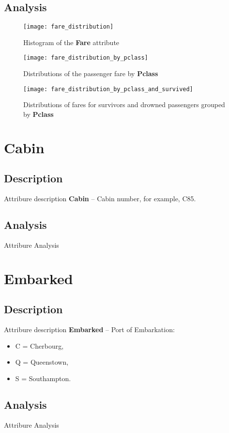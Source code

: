 \subsection{Analysis}

\begin{figure}[!ht]
    \centering
    \texttt{[image: fare\_distribution]}
    \caption{Histogram of the \textbf{Fare} attribute}
    \label{pic:fare_distribution}
\end{figure}

\begin{figure}[!ht]
    \centering
    \texttt{[image: fare\_distribution\_by\_pclass]}
    \caption{Distributions of the passenger fare by \textbf{Pclass}}
    \label{pic:fare_distribution_by_pclass}
\end{figure}

\begin{figure}[!ht]
    \centering
    \texttt{[image: fare\_distribution\_by\_pclass\_and\_survived]}
    \caption{Distributions of fares for survivors and drowned passengers grouped by \textbf{Pclass}}
    \label{pic:fare_distribution_by_pclass_and_survived} 
\end{figure}


\section{Cabin} \label{section:Cabin}
\subsection{Description}
Attribure description
\textbf{Cabin} -- Cabin number, for example, C85.

\subsection{Analysis}
Attribure Analysis


\section{Embarked} \label{section:Embarked}
\subsection{Description}
Attribure description
\textbf{Embarked} -- Port of Embarkation:
\begin{itemize}
    \item C = Cherbourg,
    \item Q = Queenstown,
    \item S = Southampton.
\end{itemize}

\subsection{Analysis}
Attribure Analysis
